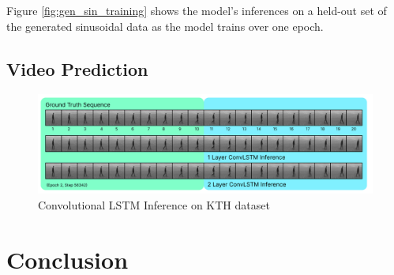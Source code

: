 \documentclass{scrartcl}
\begin{document}
Figure \ref{fig:gen_sin_training} shows the model's inferences on a held-out
set of the generated sinusoidal data as the model trains over one epoch. 

\subsection{Video Prediction}
\label{subsec:experiment_vp}

\begin{figure}[H]
	\begin{center}
		\includegraphics[width=1\textwidth]{images/kth/KTHEpoch2Step56342.png}
	\end{center}
	\caption{Convolutional LSTM Inference on KTH dataset}
	\label{img:lstm_kth_inference}
\end{figure}

\newpage
\section{Conclusion}
\label{sec:conclusion}


\newpage

\newpage
\end{document}
